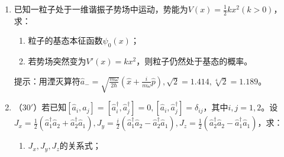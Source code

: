 \begin{enumerate}
{\begin{enumerate}
		\item 由 $L_y=(L_+-L_-)/(2i)$，
		\[
			\boxed{L_y=\frac{\hbar}{\sqrt2}
			\begin{pmatrix}0&-i&0\\i&0&-i\\0&i&0\end{pmatrix}}.
		\]
	\end{enumerate}
}


\item 
已知一粒子处于一维谐振子势场中运动，势能为$V(x)=\frac{1}{2}kx^2(k>0)$，求：
\begin{enumerate}
	\item
粒子的基态本征函数$\psi_0(x)$；

\item 
若势场突然变为$V'(x)=kx^2$，则粒子仍然处于基态的概率。
\end{enumerate}

提示：用湮灭算符$\hat{a}_-=\sqrt{\frac{m\omega}{2\hbar}}(\hat{x}+\frac{i}{m\omega}\hat{p}),\sqrt2=1.414,\sqrt[4]{2}=1.189$。





\item 	
（$30'$）若已知$[\hat{a}_i,\hat{a}_j]=[\hat{a}_i^\dagger,\hat{a}_j^\dagger]=0,[\hat{a}_i,\hat{a}_j^\dagger]=\delta_{ij}$，其中$i,j=1,2$。设$J_x=\frac{1}{2}(\hat{a}^\dagger_1\hat{a}_2+\hat{a}^\dagger_2\hat{a}_1),J_y=\frac{i}{2}(\hat{a}^\dagger_1\hat{a}_2-\hat{a}^\dagger_2\hat{a}_1),J_z=\frac{1}{2}(\hat{a}^\dagger_2\hat{a}_2-\hat{a}^\dagger_1\hat{a}_1)$，求：
\begin{enumerate}
	\item
$J_x,J_y,J_z$的关系式；


\end{enumerate}
\end{enumerate}
